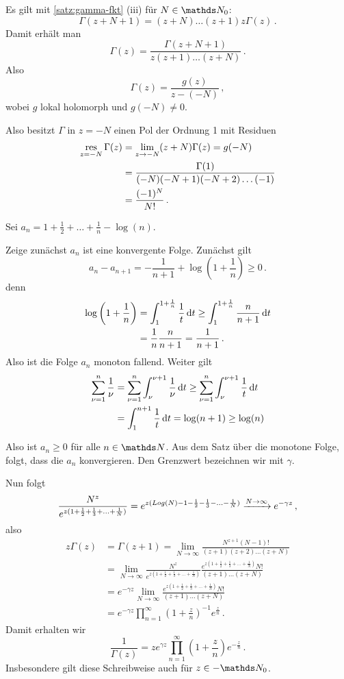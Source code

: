 \begin{bewe-list}
\item Es gilt mit \autoref{satz:gamma-fkt} (iii) für $N\in\NN_0$:
\[
	\Gamma(z+N+1)
	= (z+N)\ldots(z+1)z\Gamma(z)
	\,.
\]
Damit erhält man
\[
	\Gamma(z)
	= \frac{\Gamma(z+N+1)}{z(z+1) \ldots (z+N)}
	\,.
\]
Also
\[
	\Gamma(z)
	= \frac{g(z)}{z-(-N)}
	\,,
\]
wobei $g$ lokal holomorph und $g(-N) \not=0$.

Also besitzt $\Gamma$ in $z=-N$ einen Pol der Ordnung 1 mit Residuen
\begin{align*}
	\operatorname*{res}_{z=-N} \Gamma(z)
	&= \lim _{z\to-N} (z+N)\Gamma(z)
	= g(-N) \\
	&= \frac{\Gamma(1)}{(-N)(-N+1)(-N+2)\ldots(-1)} \\
	&= \frac{(-1)^N}{N!}
	\,.
\end{align*}

\item Sei $a_n = 1 + \frac{1}{2} + \ldots + \frac{1}{n} - \log(n)$.

Zeige zunächst $a_n$ ist eine konvergente Folge.
Zunächst gilt
\[
	a_n - a_{n+1}
	= -\frac{1}{n+1} + \log\left(1+\frac{1}{n}\right)
	\geq 0
	\,.
\]
denn
\begin{align*}
	\log\left(1+\frac{1}{n}\right)
	&= \int_1^{1+\frac{1}{n}} \frac{1}{t} \,\mathrm{d} t
	\geq \int_1^{1+\frac{1}{n}} \frac{n}{n+1} \,\mathrm{d} t \\
	&= \frac{1}{n}\frac{n}{n+1}
	= \frac{1}{n+1}
	\,.
\end{align*}
Also ist die Folge $a_n$ monoton fallend.
Weiter gilt
\begin{align*}
	\sum_{\nu=1}^n \frac{1}{\nu}
	&= \sum_{\nu=1}^n \int_\nu^{\nu+1} \frac{1}{\nu}\,\mathrm{d} t
	\geq \sum_{\nu=1}^n \int_\nu^{\nu+1} \frac{1}{t}\,\mathrm{d} t \\
	&= \int_1^{n+1}\frac{1}{t}\,\mathrm{d} t
	= \log(n+1)
	\geq \log(n)
\end{align*}

Also ist $a_n \geq 0$ für alle $n\in\NN$.
Aus dem Satz über die monotone Folge, folgt, dass die $a_n$ konvergieren.
Den Grenzwert bezeichnen wir mit $\gamma$.

Nun folgt
\[
	\frac{N^z}{e^{z(1+\frac{1}{2} + \frac{1}{3} + \ldots + \frac{1}{N})}}
	= e^{z(Log(N)- 1 - \frac{1}{2} - \frac{1}{3} - \ldots - \frac{1}{N})}
	\xrightarrow{N\to\infty} e^{-\gamma z}
	\,,
\]
also
\begin{align*}
	z\Gamma(z)
	&= \Gamma(z+1)
	= \lim_{N\to\infty} \frac{N^{z+1} (N-1)!}{(z+1)(z+2)\ldots(z+N)} \\
	&= \lim_{N\to\infty} \frac{N^z}{e^{z(1+\frac{1}{2} + \frac{1}{3} + \ldots + \frac{1}{N})}} \frac{e^{z(1+\frac{1}{2} + \frac{1}{3} + \ldots + \frac{1}{N})}N!}{(z+1)\ldots(z+N)} \\
	&= e^{-\gamma z} \lim_{N\to\infty} \frac{e^{z(1+\frac{1}{2} + \frac{1}{3} + \ldots + \frac{1}{N})}N!}{(z+1)\ldots(z+N)} \\
	&= e^{-\gamma z} \prod_{n=1}^\infty \left(1+\frac{z}{n}\right)^{-1}e^{\frac{z}{n}}
	\,.
\end{align*}
Damit erhalten wir
\[
	\frac{1}{\Gamma(z)}
	= ze^{\gamma z} \prod_{n=1}^\infty \left(1+\frac{z}{n}\right)e^{-\frac{z}{n}}
	\,.
\]
Insbesondere gilt diese Schreibweise auch für $z\in-\NN_0$.


\end{bewe-list}
